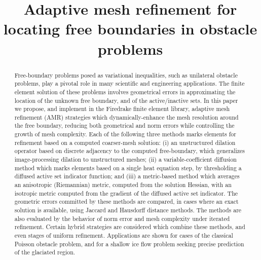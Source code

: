\documentclass[]{interact}
\theoremstyle{plain}%
\theoremstyle{definition}
\theoremstyle{remark}
\begin{document}

\title{Adaptive mesh refinement for locating free boundaries in obstacle problems}

\author{
}

\maketitle

\begin{abstract}
Free-boundary problems posed as variational inequalities, such as unilateral obstacle problems, play a pivotal role in many scientific and engineering applications.  The finite element solution of these problems involves geometrical errors in approximating the location of the unknown free boundary, and of the active/inactive sets.  In this paper we propose, and implement in the Firedrake finite element library, adaptive mesh refinement (AMR) strategies which dynamically-enhance the mesh resolution around the free boundary, reducing both geometrical and norm errors while controlling the growth of mesh complexity.  Each of the following three methods marks elements for refinement based on a computed coarser-mesh solution: (i) an unstructured dilation operator based on discrete adjacency to the computed free-boundary, which generalizes image-processing dilation to unstructured meshes; (ii) a variable-coefficient diffusion method which marks elements based on a single heat equation step, by thresholding a diffused active set indicator function; and (iii) a metric-based method which averages an anisotropic (Riemannian) metric, computed from the solution Hessian, with an isotropic metric computed from the gradient of the diffused active set indicator.  The geometric errors committed by these methods are compared, in cases where an exact solution is available, using Jaccard and Hausdorff distance methods.  The methods are also evaluated by the behavior of norm error and mesh complexity under iterated refinement.  Certain hybrid strategies are considered which combine these methods, and even stages of uniform refinement.  Applications are shown for cases of the classical Poisson obstacle problem, and for a shallow ice flow problem seeking precise prediction of the glaciated region.
\end{abstract}
\end{document}

